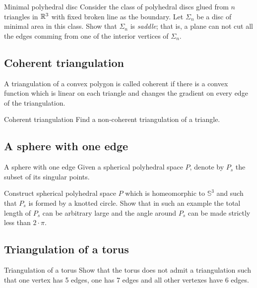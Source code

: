 \begin{pr}{}{Minimal polyhedral disc}\label{Minimal polyhedral disc}
Consider the  class of polyhedral discs glued from $n$ triangles in $\mathbb{R}^3$ 
with fixed broken line as the boundary.
Let $\Sigma_n$ be a disc of minimal area in this class.
Show that $\Sigma_n$ is  \emph{saddle};
that is, a plane can not cut all the edges comming from one of the interior vertices of $\Sigma_n$.
\end{pr}

\subsection*{Coherent triangulation\easy}

A triangulation of a convex polygon is called coherent if there is a convex function which is linear on each triangle and changes the gradient on every edge of the triangulation.

\begin{pr}{\easy}{Coherent triangulation}\label{Coherent triangulation} 
Find a non-coherent triangulation of a triangle.
\end{pr}

\subsection*{A sphere with one edge\hard}

\begin{pr}{\hard}{A sphere with one edge}\label{panov-S^3} 
Given  a spherical polyhedral space $P$,
denote by $P_s$ the subset of its 
singular points.

Construct spherical polyhedral space $P$ which is homeomorphic to $\mathbb{S}^3$ and such that $P_s$ is formed by a knotted circle.
Show that in such an example the total length of $P_s$ can be arbitrary large and the angle around $P_s$ can be made strictly less than $2\cdot\pi$.
\end{pr}

\subsection*{Triangulation of a torus}

\begin{pr}{}{Triangulation of a torus}\label{Triangulation of a torus}
Show that the torus does not admit a triangulation 
such that one vertex has 5 edges,
one has 7 edges and 
all other vertexes have 
6 edges. 
\end{pr}


